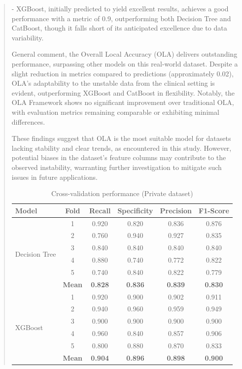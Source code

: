 \documentclass[runningheads]{llncs}
\begin{document}
\begin{abstract}
- XGBoost, initially predicted to yield excellent results, achieves a good performance with a metric of 0.9, outperforming both Decision Tree and CatBoost, though it falls short of its anticipated excellence due to data variability. 

General comment, the Overall Local Accuracy (OLA) delivers outstanding performance, surpassing other models on this real-world dataset. Despite a slight reduction in metrics compared to predictions (approximately 0.02), OLA's adaptability to the unstable data from the clinical setting is evident, outperforming XGBoost and CatBoost in flexibility. Notably, the OLA Framework shows no significant improvement over traditional OLA, with evaluation metrics remaining comparable or exhibiting minimal differences.

These findings suggest that OLA is the most suitable model for datasets lacking stability and clear trends, as encountered in this study. However, potential biases in the dataset's feature columns may contribute to the observed instability, warranting further investigation to mitigate such issues in future applications.
\begin{table}[H]
\caption{Cross-validation performance (Private dataset)}
\label{tab:private_cv_updated}
\centering
\small
\setlength{\tabcolsep}{4pt}
\renewcommand{\arraystretch}{1.1}
\begin{tabular}{|l|c|c|c|c|c|}
\hline
\textbf{Model} & \textbf{Fold} & \textbf{Recall} & \textbf{Specificity} & \textbf{Precision} & \textbf{F1-Score} \\
\hline
\multirow{6}{*}{Decision Tree} 
& 1 & 0.920 & 0.820 & 0.836 & 0.876 \\
& 2 & 0.760 & 0.940 & 0.927 & 0.835 \\
& 3 & 0.840 & 0.840 & 0.840 & 0.840 \\
& 4 & 0.880 & 0.740 & 0.772 & 0.822 \\
& 5 & 0.740 & 0.840 & 0.822 & 0.779 \\
& \textbf{Mean} & \textbf{0.828} & \textbf{0.836} & \textbf{0.839} & \textbf{0.830} \\
\hline

\multirow{6}{*}{XGBoost}
& 1 & 0.920 & 0.900 & 0.902 & 0.911 \\
& 2 & 0.940 & 0.960 & 0.959 & 0.949 \\
& 3 & 0.900 & 0.900 & 0.900 & 0.900 \\
& 4 & 0.960 & 0.840 & 0.857 & 0.906 \\
& 5 & 0.800 & 0.880 & 0.870 & 0.833 \\
& \textbf{Mean} & \textbf{0.904} & \textbf{0.896} & \textbf{0.898} & \textbf{0.900} \\
\hline


\end{tabular}
\end{table}
\end{abstract}
\end{document}
